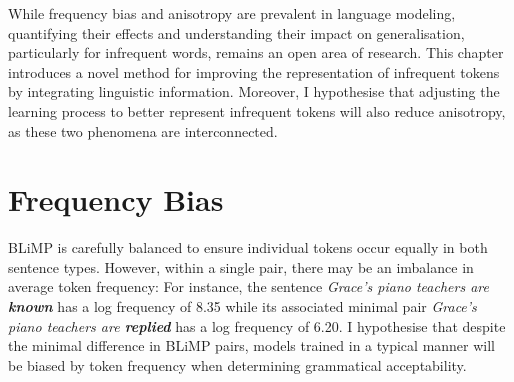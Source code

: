 
\vspace{1em}

While frequency bias and anisotropy are prevalent in language modeling, quantifying their effects and understanding their impact on generalisation, particularly for infrequent words, remains an open area of research. This chapter introduces a novel method for improving the representation of infrequent tokens by integrating linguistic information. Moreover, I hypothesise that adjusting the learning process to better represent infrequent tokens will also reduce anisotropy, as these two phenomena are interconnected.

\section{Frequency Bias}
\label{sec:freq-bias}

BLiMP is carefully balanced to ensure individual tokens occur equally in both sentence types. However, within a single pair, there may be an imbalance in average token frequency: For instance, the sentence
\textit{Grace's piano teachers are \textbf{known}} has a log frequency of 8.35 while its associated minimal pair \textit{Grace's piano teachers are \textbf{replied}} has a log frequency of 6.20.  I hypothesise that despite the minimal difference in BLiMP pairs, models trained in a typical manner will be biased by token frequency when determining grammatical acceptability.

